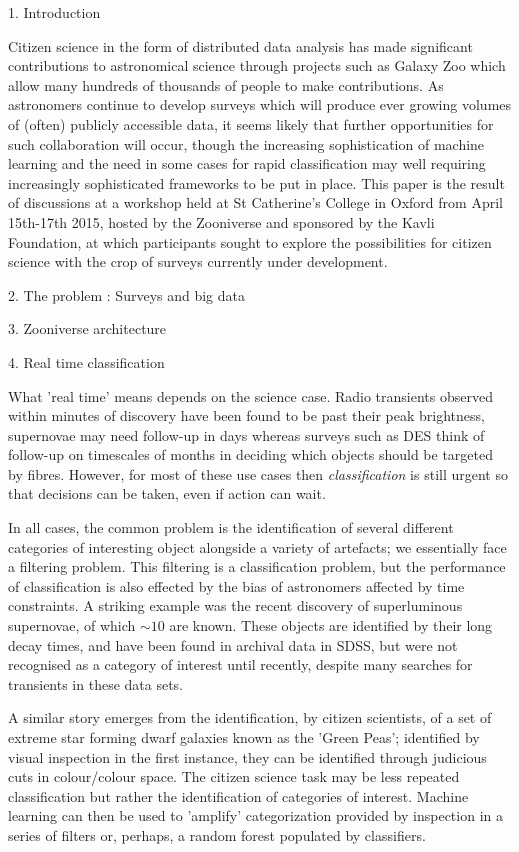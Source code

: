 1. Introduction

Citizen science in the form of distributed data analysis has made significant contributions to astronomical science through projects such as Galaxy Zoo which allow many hundreds of thousands of people to make contributions. As astronomers continue to develop surveys which will produce ever growing volumes of (often) publicly accessible data, it seems likely that further opportunities for such collaboration will occur, though the increasing sophistication of machine learning and the need in some cases for rapid classification may well requiring increasingly sophisticated frameworks to be put in place. This paper is the result of discussions at a workshop held at St Catherine's College in Oxford from April 15th-17th 2015, hosted by the Zooniverse and sponsored by the Kavli Foundation, at which participants sought to explore the possibilities for citizen science with the crop of surveys currently under development. 

2. The problem : Surveys and big data

3. Zooniverse architecture

4. Real time classification

What 'real time' means depends on the science case. Radio transients observed within minutes of discovery have been found to be past their peak brightness, supernovae may need follow-up in days whereas surveys such as DES think of follow-up on timescales of months in deciding which objects should be targeted by fibres. However, for most of these use cases then \emph{classification} is still urgent so that decisions can be taken, even if action can wait. 

In all cases, the common problem is the identification of several different categories of interesting object alongside a variety of artefacts; we essentially face a filtering problem. This filtering is a classification problem, but the performance of classification is also effected by the bias of astronomers affected by time constraints. A striking example was the recent discovery of superluminous supernovae, of which $\sim 10$ are known. These objects are identified by their long decay times, and have been found in archival data in SDSS, but were not recognised as a category of interest until recently, despite many searches for transients in these data sets. 

A similar story emerges from the identification, by citizen scientists, of a set of extreme star forming dwarf galaxies known as the 'Green Peas'; identified by visual inspection in the first instance, they can be identified through judicious cuts in colour/colour space. The citizen science task may be less repeated classification but rather the identification of categories of interest. Machine learning can then be used to 'amplify' categorization provided by inspection in a series of filters or, perhaps, a random forest populated by classifiers. 


